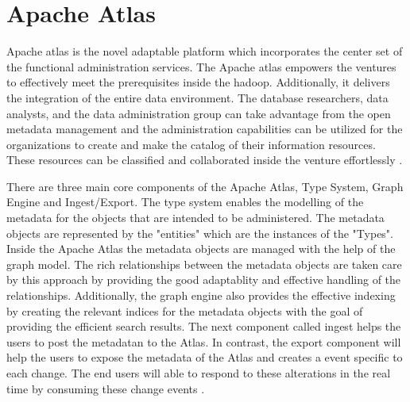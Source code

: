 \section{Apache Atlas}
Apache atlas is the novel adaptable platform which incorporates the center 
set of the functional administration services. The Apache atlas empowers 
the ventures to effectively meet the prerequisites inside the hadoop. 
Additionally, it  delivers the integration of the entire  data environment. 
The database researchers, data analysts, and the data administration group 
can take advantage from the open metadata management and the administration 
capabilities can be utilized for the organizations to create and make the 
catalog of their information resources. These resources can be classified 
and collaborated inside the venture effortlessly
\cite{hid-sp18-412-Apache_Atlas_by_Maven}.

There are three main core components of the Apache Atlas, Type System, 
Graph Engine and Ingest/Export. The type system enables the modelling of 
the metadata for the objects that are intended to be administered. 
The metadata objects are represented by the "entities" which are the 
instances of the "Types". Inside the Apache Atlas the metadata objects are 
managed with the help of the graph model. The rich relationships between the 
metadata objects are taken care by this approach by providing the good 
adaptablity and effective handling of the relationships. Additionally, 
the graph engine also provides the effective indexing by creating the 
relevant indices for the metadata objects with the goal of providing the 
efficient search results. The next component called ingest helps the users 
to post the metadatan to the Atlas. In contrast, the export component will 
help the users to expose the metadata of the Atlas and creates a event 
specific to each change. The end users will able to respond to these 
alterations in the real time by consuming these change events 
\cite{hid-sp18-412-Apache_Atlas_architecture}.
